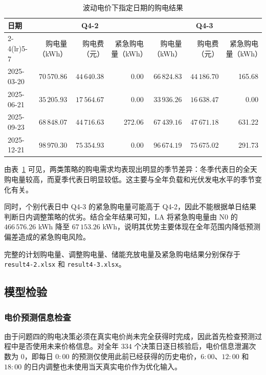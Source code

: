 \begin{table}[!htbp]
  \centering
  \caption{波动电价下指定日期的购电结果}
  \label{tab:q4_dates}
  \small
  \begin{tabular}{lrrr rrr}
    \toprule
    日期 & \multicolumn{3}{c}{Q4-2} & \multicolumn{3}{c}{Q4-3} \\
    \cmidrule(lr){2-4}\cmidrule(lr){5-7}
    & 购电量（kWh） & 购电费（元） & 紧急购电量（kWh）
    & 购电量（kWh） & 购电费（元） & 紧急购电量（kWh） \\
    \midrule
    2025-03-20 & $70\,570.86$ & $44\,640.38$ & 0.00
               & $66\,824.83$ & $44\,186.70$ & 165.68 \\
    2025-06-21 & $35\,205.93$ & $17\,564.67$ & 0.00
               & $33\,936.26$ & $16\,638.47$ & 0.00 \\
    2025-09-23 & $68\,848.07$ & $44\,716.63$ & 272.06
               & $67\,439.16$ & $47\,671.18$ & 631.22 \\
    2025-12-21 & $98\,970.30$ & $75\,354.93$ & 0.00
               & $96\,674.19$ & $75\,675.02$ & 291.73 \\
    \bottomrule
  \end{tabular}
\end{table}

由表~\ref{tab:q4_dates} 可见，两类策略的购电需求均表现出明显的季节差异：冬季代表日的全天购电量较高，而夏季代表日明显较低。这主要与全年负载和光伏发电水平的季节变化有关。

同时，个别代表日中 Q4-3 的紧急购电量可能高于 Q4-2，因此不能根据单日结果判断日内调整策略的优劣。结合全年结果可知，LA 将紧急购电量由 N0 的 $466\,576.26$ kWh 降至 $67\,153.26$ kWh，说明其优势主要体现在全年范围内降低预测偏差造成的紧急购电风险。

完整的计划购电量、调整购电量、储能充放电量及紧急购电结果分别保存于 \texttt{result4-2.xlsx} 和 \texttt{result4-3.xlsx}。

\subsection{模型检验}

\subsubsection{电价预测信息检查}

由于问题四的购电决策必须在真实电价尚未完全获得时完成，因此首先检查预测过程中是否使用未来价格信息。对全年 $334$ 个决策日逐日核验后，电价信息泄漏次数为 0，即每日 $0{:}00$ 的预测仅使用此前已经获得的历史电价，$6{:}00$、$12{:}00$ 和 $18{:}00$ 的日内调整也未使用当天真实电价作为优化输入。

